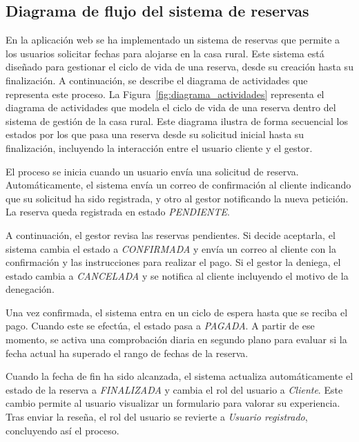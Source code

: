 \subsection{Diagrama de flujo del sistema de reservas}
En la aplicación web se ha implementado un sistema de reservas que permite a los usuarios solicitar fechas para alojarse en la casa rural. Este sistema está diseñado para gestionar el ciclo de vida de una reserva, desde su creación hasta su finalización. A continuación, se describe el diagrama de actividades que representa este proceso.
La Figura~\ref{fig:diagrama_actividades} representa el diagrama de actividades que modela el ciclo de vida de una reserva dentro del sistema de gestión de la casa rural. Este diagrama ilustra de forma secuencial los estados por los que pasa una reserva desde su solicitud inicial hasta su finalización, incluyendo la interacción entre el usuario cliente y el gestor.

El proceso se inicia cuando un usuario envía una solicitud de reserva. Automáticamente, el sistema envía un correo de confirmación al cliente indicando que su solicitud ha sido registrada, y otro al gestor notificando la nueva petición. La reserva queda registrada en estado \textit{PENDIENTE}.

A continuación, el gestor revisa las reservas pendientes. Si decide aceptarla, el sistema cambia el estado a \textit{CONFIRMADA} y envía un correo al cliente con la confirmación y las instrucciones para realizar el pago. Si el gestor la deniega, el estado cambia a \textit{CANCELADA} y se notifica al cliente incluyendo el motivo de la denegación.

Una vez confirmada, el sistema entra en un ciclo de espera hasta que se reciba el pago. Cuando este se efectúa, el estado pasa a \textit{PAGADA}. A partir de ese momento, se activa una comprobación diaria en segundo plano para evaluar si la fecha actual ha superado el rango de fechas de la reserva.

Cuando la fecha de fin ha sido alcanzada, el sistema actualiza automáticamente el estado de la reserva a \textit{FINALIZADA} y cambia el rol del usuario a \textit{Cliente}. Este cambio permite al usuario visualizar un formulario para valorar su experiencia. Tras enviar la reseña, el rol del usuario se revierte a \textit{Usuario registrado}, concluyendo así el proceso.

